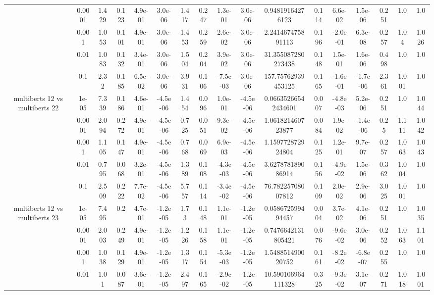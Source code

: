 \begin{tabular}{|c|c|c|c|c|c|c|c|c|c|c|c|c|c|c|c|c|}
 & 0.0001 & 1.429 & 0.123 & 4.9e-01 & 3.0e-06 & 1.417 & 0.247 & 1.3e-01 & 3.0e-06 & 0.94819164276123 & 0.114 & 6.6e-02 & 1.5e-06 & 0.251 & 1.0 & 1.0 \\
 & 0.001 & 1.053 & 0.101 & 4.9e-01 & 3.0e-06 & 1.453 & 0.259 & 2.6e-02 & 3.0e-06 & 2.241467475891113 & 0.196 & -2.0e-01 & 6.3e-08 & 0.257 & 1.04 & 1.026 \\
 & 0.01 & 1.083 & 0.132 & 3.4e-01 & 3.0e-06 & 1.504 & 0.204 & 3.9e-02 & 3.0e-06 & 31.355087280273438 & 0.148 & 1.5e-01 & 1.6e-06 & 0.498 & 1.0 & 1.0 \\
 & 0.1 & 2.32 & 0.185 & 6.5e-02 & 3.0e-06 & 3.931 & 0.106 & -7.5e-03 & 3.0e-06 & 157.75762939453125 & 0.165 & -1.6e-01 & -1.7e-06 & 2.361 & 1.001 & 1.0 \\
\hline
\multirow{5}{*}{multiberts 12 vs multiberts 22} & 1e-05 & 7.339 & 0.186 & 4.6e-01 & -4.5e-06 & 1.454 & 0.096 & 1.0e-01 & -4.5e-06 & 0.06635266542434601 & 0.007 & -4.8e-03 & 5.2e-06 & 0.251 & 1.0 & 1.044 \\
 & 0.0001 & 2.094 & 0.272 & 4.9e-01 & -4.5e-06 & 0.725 & 0.051 & 9.3e-02 & -4.5e-06 & 1.061821460723877 & 0.084 & 1.9e-02 & -1.4e-06 & 0.25 & 1.111 & 1.042 \\
 & 0.001 & 1.105 & 0.147 & 4.9e-01 & -4.5e-06 & 0.768 & 0.069 & 6.9e-03 & -4.5e-06 & 1.159772872924804 & 0.125 & 1.2e-01 & 9.7e-07 & 0.257 & 1.063 & 1.043 \\
 & 0.01 & 0.795 & 0.068 & 3.2e-01 & -4.5e-06 & 1.389 & 0.108 & -4.3e-03 & -4.5e-06 & 3.627878189086914 & 0.156 & -4.9e-02 & 1.5e-06 & 0.362 & 1.004 & 1.0 \\
 & 0.1 & 2.509 & 0.222 & 7.7e-02 & -4.5e-06 & 5.757 & 0.114 & -3.4e-02 & -4.5e-06 & 76.78225708007812 & 0.109 & 2.0e-02 & 2.9e-06 & 3.025 & 1.001 & 1.0 \\
\hline
\multirow{5}{*}{multiberts 12 vs multiberts 23} & 1e-05 & 7.495 & 0.2 & 4.7e-01 & -1.2e-05 & 1.73 & 0.148 & 1.1e-01 & -1.2e-05 & 0.058672599494457 & 0.004 & 3.7e-02 & 4.1e-06 & 0.251 & 1.0 & 1.035 \\
 & 0.0001 & 2.003 & 0.249 & 4.9e-01 & -1.2e-05 & 1.226 & 0.158 & 1.1e-01 & -1.2e-05 & 0.7476642131805421 & 0.076 & -9.6e-02 & 3.0e-06 & 0.252 & 1.063 & 1.101 \\
 & 0.001 & 1.038 & 0.129 & 4.9e-01 & -1.2e-05 & 1.317 & 0.154 & -5.3e-03 & -1.2e-05 & 1.548851490020752 & 0.161 & -8.2e-02 & -6.8e-07 & 0.255 & 1.0 & 1.0 \\
 & 0.01 & 1.01 & 0.087 & 3.6e-01 & -1.2e-05 & 2.497 & 0.165 & -2.9e-02 & -1.2e-05 & 10.590106964111328 & 0.325 & -9.3e-02 & 3.1e-07 & 0.271 & 1.018 & 1.001 \\

\end{tabular}
